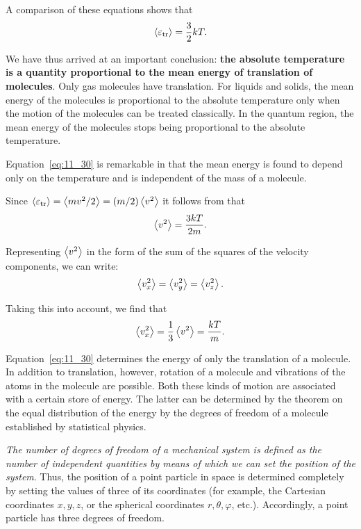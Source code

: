 \noindent
A comparison of these equations shows that
\begin{equation}\label{eq:11_30}
	\left\langle \varepsilon_{\text{tr}} \right\rangle = \frac{3}{2}kT.
\end{equation}

\noindent
We have thus arrived at an important conclusion: \textbf{the absolute temperature is a quantity proportional to the mean energy of translation of molecules}. Only gas molecules have translation. For liquids and solids, the mean energy of the molecules is proportional to the absolute temperature only when the motion of the molecules can be treated classically. In the quantum region, the mean energy of the molecules stops being proportional to the absolute temperature.

Equation~\eqref{eq:11_30} is remarkable in that the mean energy is found to depend only on the temperature and is independent of the mass of a molecule.

Since $\left\langle \varepsilon_{\text{tr}} \right\rangle=\left\langle mv^2/2 \right\rangle=(m/2)\left\langle v^2 \right\rangle$ it follows from  that
\begin{equation}\label{eq:11_31}
	\left\langle v^2 \right\rangle = \frac{3kT}{2m}.
\end{equation}

\noindent
Representing $\left\langle v^2 \right\rangle$ in the form of the sum of the squares of the velocity components, we can write:
\begin{equation*}
	\left\langle v_x^2 \right\rangle = \left\langle v_y^2 \right\rangle = \left\langle v_z^2 \right\rangle.
\end{equation*}

\noindent
Taking this into account, we find that
\begin{equation}\label{eq:11_32}
	\left\langle v_x^2 \right\rangle = \frac{1}{3}\left\langle v^2 \right\rangle = \frac{kT}{m}.
\end{equation}

Equation~\eqref{eq:11_30} determines the energy of only the translation of a molecule. In addition to translation, however, rotation of a molecule and vibrations of the atoms in the molecule are possible. Both these kinds of motion are associated with a certain store of energy. The latter can be determined by the theorem on the equal distribution of the energy by the degrees of freedom of a molecule established by statistical physics.

\textit{The number of degrees of freedom of a mechanical system is defined as the number of independent quantities by means of which we can set the position of the system}. Thus, the position of a point particle in space is determined completely by setting the values of three of its coordinates (for example, the Cartesian coordinates $x, y, z$, or the spherical coordinates $r, \theta, \varphi$, etc.). Accordingly, a point particle has three degrees of freedom.

